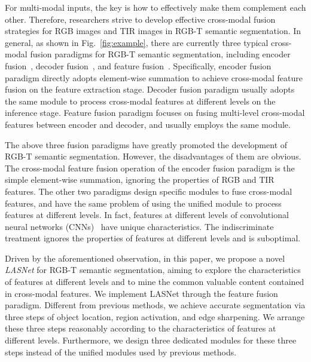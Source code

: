 \documentclass[journal]{IEEEtran}
\begin{document}
For multi-modal inputs, the key is how to effectively make them complement each other.
Therefore, researchers strive to develop effective cross-modal fusion strategies for RGB images and TIR images in RGB-T semantic segmentation.
In general, as shown in Fig.~\ref{fig:example}, there are currently three typical cross-modal fusion paradigms for RGB-T semantic segmentation, including encoder fusion~\cite{2019RTFNet,2021MLFNet,2021FEANet,2021FuseSeg,2022MFFENet}, decoder fusion~\cite{2017MFNet,2021ABMDRNet,2022MTANet}, and feature fusion~\cite{2021GMNet,2022GCNet,2022EGFNet}.
Specifically, encoder fusion paradigm directly adopts element-wise summation to achieve cross-modal feature fusion on the feature extraction stage.
Decoder fusion paradigm usually adopts the same module to process cross-modal features at different levels on the inference stage.
Feature fusion paradigm focuses on fusing multi-level cross-modal features between encoder and decoder, and usually employs the same module.


The above three fusion paradigms have greatly promoted the development of RGB-T semantic segmentation.
However, the disadvantages of them are obvious.
The cross-modal feature fusion operation of the encoder fusion paradigm is the simple element-wise summation, ignoring the properties of RGB and TIR features.
The other two paradigms design specific modules to fuse cross-modal features, and have the same problem of using the unified module to process features at different levels.
In fact, features at different levels of convolutional neural networks (CNNs)~\cite{1989CNN} have unique characteristics.
The indiscriminate treatment ignores the properties of features at different levels and is suboptimal.


Driven by the aforementioned observation, in this paper, we propose a novel \emph{LASNet} for RGB-T semantic segmentation, aiming to explore the characteristics of features at different levels and to mine the common valuable content contained in cross-modal features.
We implement LASNet through the feature fusion paradigm.
Different from previous methods, we achieve accurate segmentation via three steps of object location, region activation, and edge sharpening.
We arrange these three steps reasonably according to the characteristics of features at different levels.
Furthermore, we design three dedicated modules for these three steps instead of the unified modules used by previous methods.
\end{document}
